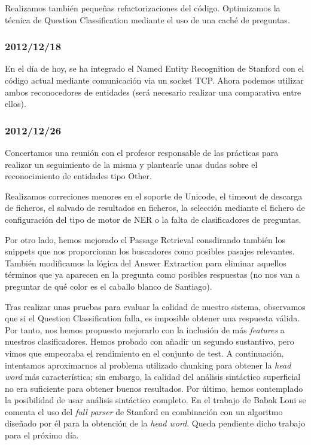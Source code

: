 \documentclass[12pt,a4paper,titlepage]{article}
\begin{document}
Realizamos también pequeñas refactorizaciones del código. Optimizamos la técnica de Question Classification mediante el uso de una caché de preguntas.

\subsubsection*{2012/12/18}
En el día de hoy, se ha integrado el Named Entity Recognition de Stanford con el código actual mediante comunicación via un socket TCP. Ahora podemos utilizar ambos reconocedores de entidades (será necesario realizar una comparativa entre ellos).

\subsubsection*{2012/12/26}
Concertamos una reunión con el profesor responsable de las prácticas para realizar un seguimiento de la misma y plantearle unas dudas sobre el reconocimiento de entidades tipo Other.

Realizamos correciones menores en el soporte de Unicode, el timeout de descarga de ficheros, el salvado de resultados en ficheros, la selección mediante el fichero de configuración del tipo de motor de NER o la falta de clasificadores de preguntas.

Por otro lado, hemos mejorado el Passage Retrieval consdirando también los snippets que nos proporcionan los buscadores como posibles pasajes relevantes. También modificamos la lógica del Answer Extraction para eliminar aquellos términos que ya aparecen en la pregunta como posibles respuestas (no nos van a preguntar de qué color es el caballo blanco de Santiago).

Tras realizar unas pruebas para evaluar la calidad de nuestro sistema, observamos que si el Question Classification falla, es imposible obtener una respuesta válida. Por tanto, nos hemos propuesto mejorarlo con la inclusión de más \emph{features} a nuestros clasificadores. Hemos probado con añadir un segundo sustantivo, pero vimos que empeoraba el rendimiento en el conjunto de test. A continuación, intentamos aproximarnos al problema utilizado chunking para obtener la \emph{head word}
más característica; sin embargo, la calidad del análisis sintáctico superficial no era suficiente para obtener buenos resultados. Por último, hemos contemplado la posibilidad de usar análisis sintáctico completo. En el trabajo de Babak Loni \cite{tesis:qc} se comenta el uso del \emph{full parser} de Stanford en combinación con un algoritmo diseñado por él para la obtención de la \emph{head word}. Queda pendiente dicho trabajo para el próximo día.
\end{document}
